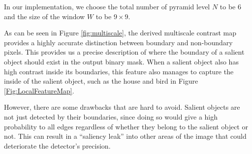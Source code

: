 \documentclass[10pt,twocolumn,letterpaper]{article}
\begin{document}


In our implementation, we choose the total number of pyramid level $N$ to be $6$ and the size of the window $W$ to be $9 \times 9$. 

As can be seen in Figure \ref{fig:multiscale}, the derived multiscale contrast map provides a highly accurate distinction between boundary and non-boundary pixels. This provides us a precise description of where the boundary of a salient object should exist in the output binary mask. When a salient object also has high contrast inside its boundaries, this feature also manages to capture the inside of the salient object, such as the house and bird in Figure \ref{Fig:LocalFeatureMap}.

However, there are some drawbacks that are hard to avoid. Salient objects are not just detected by their boundaries, since doing so would give a high probability to all edges regardless of whether they belong to the salient object or not.  This can result in a ``saliency leak'' into other areas of the image that could deteriorate the detector's precision.
\end{document}
